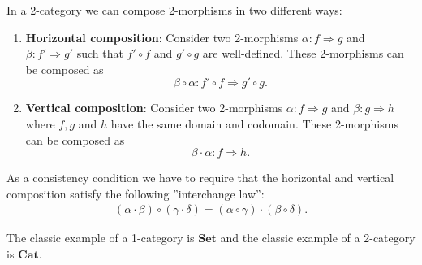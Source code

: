     \begin{example}[2-category]
        In a 2-category we can compose 2-morphisms in two different ways:
        \begin{enumerate}
            \item \textbf{Horizontal composition}:
            Consider two 2-morphisms $\alpha:f\Rightarrow g$ and $\beta:f'\Rightarrow g'$ such that $f'\circ f$ and $g'\circ g$ are well-defined. These 2-morphisms can be composed as \[\beta\circ\alpha: f'\circ f\Rightarrow g'\circ g.\]
            \item \textbf{Vertical composition}:
            Consider two 2-morphisms $\alpha:f\Rightarrow g$ and $\beta:g\Rightarrow h$ where $f,g$ and $h$ have the same domain and codomain. These 2-morphisms can be composed as \[\beta\cdot\alpha:f\Rightarrow h.\]
        \end{enumerate}
        As a consistency condition we have to require that the horizontal and vertical composition satisfy the following ''interchange law'':
        \begin{gather}
            (\alpha\cdot\beta)\circ(\gamma\cdot\delta) = (\alpha\circ\gamma)\cdot(\beta\circ\delta).
        \end{gather}
    \end{example}

    \begin{example}
        The classic example of a 1-category is $\mathbf{Set}$ and the classic example of a 2-category is $\mathbf{Cat}$.
    \end{example}



